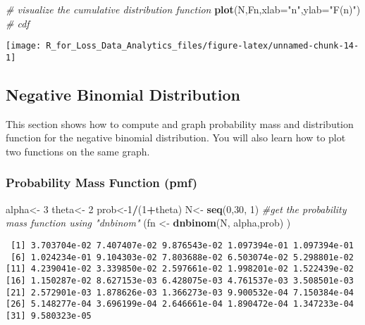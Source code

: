 \documentclass[]{book}
\newenvironment{Shaded}{\begin{snugshade}}{\end{snugshade}}
\newcommand{\KeywordTok}[1]{\textcolor[rgb]{0.13,0.29,0.53}{\textbf{#1}}}
\newcommand{\DataTypeTok}[1]{\textcolor[rgb]{0.13,0.29,0.53}{#1}}
\newcommand{\DecValTok}[1]{\textcolor[rgb]{0.00,0.00,0.81}{#1}}
\newcommand{\StringTok}[1]{\textcolor[rgb]{0.31,0.60,0.02}{#1}}
\newcommand{\CommentTok}[1]{\textcolor[rgb]{0.56,0.35,0.01}{\textit{#1}}}
\newcommand{\OperatorTok}[1]{\textcolor[rgb]{0.81,0.36,0.00}{\textbf{#1}}}
\newcommand{\NormalTok}[1]{#1}
\theoremstyle{definition}
\theoremstyle{definition}
\theoremstyle{definition}
\theoremstyle{remark}
\begin{document}
\begin{Shaded}
\begin{Highlighting}[]
\CommentTok{# visualize the cumulative distribution function}
\KeywordTok{plot}\NormalTok{(N,Fn,}\DataTypeTok{xlab=}\StringTok{"n"}\NormalTok{,}\DataTypeTok{ylab=}\StringTok{"F(n)"}\NormalTok{) }\CommentTok{# cdf}
\end{Highlighting}
\end{Shaded}

\begin{center}\texttt{[image: R\_for\_Loss\_Data\_Analytics\_files/figure-latex/unnamed-chunk-14-1]} \end{center}

\subsection{Negative Binomial
Distribution}\label{negative-binomial-distribution}

This section shows how to compute and graph probability mass and
distribution function for the negative binomial distribution. You will
also learn how to plot two functions on the same graph.

\subsubsection{Probability Mass Function
(pmf)}\label{probability-mass-function-pmf-1}

\begin{Shaded}
\begin{Highlighting}[]
\NormalTok{alpha<-}\StringTok{ }\DecValTok{3}
\NormalTok{theta<-}\StringTok{ }\DecValTok{2}
\NormalTok{prob<-}\DecValTok{1}\OperatorTok{/}\NormalTok{(}\DecValTok{1}\OperatorTok{+}\NormalTok{theta)}
\NormalTok{N<-}\StringTok{ }\KeywordTok{seq}\NormalTok{(}\DecValTok{0}\NormalTok{,}\DecValTok{30}\NormalTok{, }\DecValTok{1}\NormalTok{)}
\CommentTok{#get the probability mass function using "dnbinom"}
\NormalTok{(fn <-}\StringTok{ }\KeywordTok{dnbinom}\NormalTok{(N, alpha,prob) )}
\end{Highlighting}
\end{Shaded}

\begin{verbatim}
 [1] 3.703704e-02 7.407407e-02 9.876543e-02 1.097394e-01 1.097394e-01
 [6] 1.024234e-01 9.104303e-02 7.803688e-02 6.503074e-02 5.298801e-02
[11] 4.239041e-02 3.339850e-02 2.597661e-02 1.998201e-02 1.522439e-02
[16] 1.150287e-02 8.627153e-03 6.428075e-03 4.761537e-03 3.508501e-03
[21] 2.572901e-03 1.878626e-03 1.366273e-03 9.900532e-04 7.150384e-04
[26] 5.148277e-04 3.696199e-04 2.646661e-04 1.890472e-04 1.347233e-04
[31] 9.580323e-05
\end{verbatim}
\end{document}

